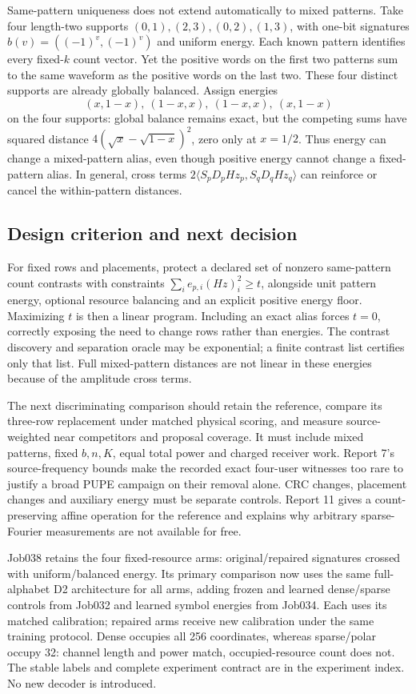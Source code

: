 \documentclass[10pt,a4paper]{article}
\begin{document}
Same-pattern uniqueness does not extend automatically to mixed patterns. Take four length-two supports
$(0,1),(2,3),(0,2),(1,3)$, with one-bit signatures $b(v)=((-1)^v,(-1)^v)$ and uniform energy.
Each known pattern identifies every fixed-$k$ count vector. Yet the positive words on the first two
patterns sum to the same waveform as the positive words on the last two. These four distinct supports
are already globally balanced. Assign energies
\[
 (x,1-x),\ (1-x,x),\ (1-x,x),\ (x,1-x)
\]
on the four supports: global balance remains exact, but the competing sums have squared distance
$4(\sqrt x-\sqrt{1-x})^2$, zero only at $x=1/2$. Thus energy can change a mixed-pattern alias,
even though positive energy cannot change a fixed-pattern alias. In general, cross terms
$2\langle S_pD_pH z_p,S_qD_qH z_q\rangle$ can reinforce or cancel the within-pattern distances.

\subsection{Design criterion and next decision}
For fixed rows and placements, protect a declared set of nonzero same-pattern count contrasts with
constraints $\sum_i e_{p,i}(H z)_i^2\geq t$, alongside unit pattern energy, optional resource balancing
and an explicit positive energy floor. Maximizing $t$ is then a linear program. Including an exact
alias forces $t=0$, correctly exposing the need to change rows rather than energies. The contrast
discovery and separation oracle may be exponential; a finite contrast list certifies only that list.
Full mixed-pattern distances are not linear in these energies because of the amplitude cross terms.

The next discriminating comparison should retain the reference, compare its three-row replacement
under matched physical scoring, and measure source-weighted near competitors and proposal coverage.
It must include mixed patterns, fixed $b,n,K$, equal total power and charged receiver work. Report 7's
source-frequency bounds make the recorded exact four-user witnesses too rare to justify a broad
PUPE campaign on their removal alone. CRC changes, placement changes and auxiliary energy must be
separate controls. Report 11 gives a count-preserving affine operation for the reference and explains
why arbitrary sparse-Fourier measurements are not available for free.

Job038 retains the four fixed-resource arms: original/repaired signatures crossed with
uniform/balanced energy. Its primary comparison now uses the same full-alphabet D2 architecture for
all arms, adding frozen and learned dense/sparse controls from Job032 and learned symbol energies
from Job034. Each uses its matched calibration; repaired arms receive new calibration under the
same training protocol. Dense occupies all 256 coordinates, whereas sparse/polar occupy 32: channel
length and power match, occupied-resource count does not. The stable labels and complete experiment
contract are in the experiment index. No new decoder is introduced.
\end{document}
